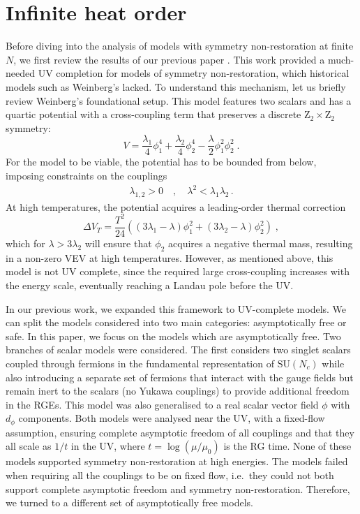 \section{Infinite heat order}
Before diving into the analysis of models with symmetry non-restoration at finite $N$, we first review the results of our previous paper \cite{Bajc:2021}. This work provided a much-needed UV completion for models of symmetry non-restoration, which historical models such as Weinberg's \cite{Weinberg:1974hy} lacked. To understand this mechanism, let us briefly review Weinberg's foundational setup. This model features two scalars and has a quartic potential with a cross-coupling term that preserves a discrete $\mathrm{Z}_2\times\mathrm{Z}_2$ symmetry:
\begin{equation}
    V=\frac{\lambda_1}{4}\phi^4_1+\frac{\lambda_2}{4}\phi_2^4-\frac{\lambda}{2}\phi_1^2\phi_2^2\;. \label{eq:VfromWeinberg}
\end{equation}
For the model to be viable, the potential has to be bounded from below, imposing constraints on the couplings
\begin{align}
    \lambda_{1,2}>0\quad,\quad \lambda^2<\lambda_1\lambda_2\,.
\end{align}
At high temperatures, the potential acquires a leading-order thermal correction
\begin{equation}
    \Delta V_T= \frac{T^2}{24}((3\lambda_1-\lambda)\phi_1^2 +(3\lambda_2-\lambda)\phi^2_2)\;,
\end{equation}
which for $\lambda>3\lambda_2$ will ensure that $\phi_2$ acquires a negative thermal mass, resulting in a non-zero VEV at high temperatures. However, as mentioned above, this model is not UV complete, since the required large cross-coupling increases with the energy scale, eventually reaching a Landau pole before the UV. 

In our previous work, we expanded this framework to UV-complete models. We can split the models considered into two main categories: asymptotically free or safe. In this paper, we focus on the models which are asymptotically free. Two branches of scalar models were considered. The first considers two singlet scalars coupled through fermions in the fundamental representation of $\mathrm{SU}(N_c)$ while also introducing a separate set of fermions that interact with the gauge fields but remain inert to the scalars (no Yukawa couplings) to provide additional freedom in the RGEs. This model was also generalised to a real scalar vector field $\phi$ with $d_\phi$ components. Both models were analysed near the UV, with a fixed-flow assumption, ensuring complete asymptotic freedom of all couplings and that they all scale as $1/t$ in the UV, where $t=\log(\mu/\mu_0)$ is the RG time. None of these models supported symmetry non-restoration at high energies. The models failed when requiring all the couplings to be on fixed flow, i.e.\ they could not both support complete asymptotic freedom and symmetry non-restoration. Therefore, we turned to a different set of asymptotically free models. 


